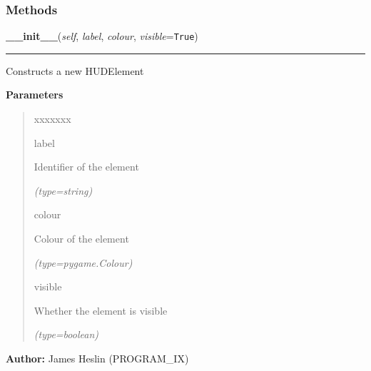   \subsubsection{Methods}

    \label{pystroke:hud:HUDElement:__init__}

    \vspace{0.5ex}

\hspace{.8\funcindent}\begin{boxedminipage}{\funcwidth}

    \raggedright \textbf{\_\_init\_\_}(\textit{self}, \textit{label}, \textit{colour}, \textit{visible}={\tt True})

    \vspace{-1.5ex}

    \rule{\textwidth}{0.5\fboxrule}
\setlength{\parskip}{2ex}
    Constructs a new HUDElement

\setlength{\parskip}{1ex}
      \textbf{Parameters}
      \vspace{-1ex}

      \begin{quote}
        \begin{Ventry}{xxxxxxx}

          \item[label]

          Identifier of the element

            {\it (type=string)}

          \item[colour]

          Colour of the element

            {\it (type=pygame.Colour)}

          \item[visible]

          Whether the element is visible

            {\it (type=boolean)}

        \end{Ventry}

      \end{quote}

\textbf{Author:} James Heslin (PROGRAM\_IX)



    \end{boxedminipage}

